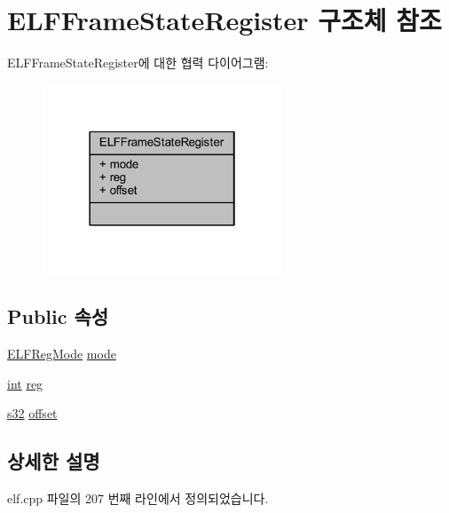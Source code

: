 \hypertarget{struct_e_l_f_frame_state_register}{}\section{E\+L\+F\+Frame\+State\+Register 구조체 참조}
\label{struct_e_l_f_frame_state_register}


E\+L\+F\+Frame\+State\+Register에 대한 협력 다이어그램\+:\nopagebreak
\begin{figure}[H]
\begin{center}
\leavevmode
\includegraphics[width=202pt]{struct_e_l_f_frame_state_register__coll__graph}
\end{center}
\end{figure}
\subsection*{Public 속성}
\begin{DoxyCompactItemize}
\item 
\mbox{\hyperlink{elf_8cpp_a5d118aeb7ff13ec2fa52230ea4878c22}{E\+L\+F\+Reg\+Mode}} \mbox{\hyperlink{struct_e_l_f_frame_state_register_a985e32a6d582507f95e02e149837498c}{mode}}
\item 
\mbox{\hyperlink{_util_8cpp_a0ef32aa8672df19503a49fab2d0c8071}{int}} \mbox{\hyperlink{struct_e_l_f_frame_state_register_a9c8eebd7a9afe0d48e833e7610b2153a}{reg}}
\item 
\mbox{\hyperlink{_system_8h_a0ce6887c26c1c49ad3be5710dd42bfd6}{s32}} \mbox{\hyperlink{struct_e_l_f_frame_state_register_a6ef710a9432cda4aace7c893717d1a16}{offset}}
\end{DoxyCompactItemize}


\subsection{상세한 설명}


elf.\+cpp 파일의 207 번째 라인에서 정의되었습니다.



